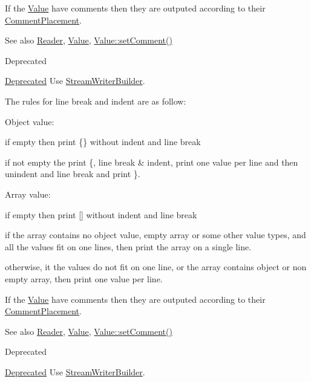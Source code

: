 If the \hyperlink{class_json_1_1_value}{Value} have comments then they are outputed according to their \hyperlink{namespace_json_a4fc417c23905b2ae9e2c47d197a45351}{Comment\+Placement}.

\begin{DoxySeeAlso}{See also}
\hyperlink{class_json_1_1_reader}{Reader}, \hyperlink{class_json_1_1_value}{Value}, \hyperlink{class_json_1_1_value_a29f3a30f7e5d3af6f38d57999bf5b480}{Value\+::set\+Comment()} 
\end{DoxySeeAlso}
\begin{DoxyRefDesc}{Deprecated}
\item[\hyperlink{deprecated__deprecated000009}{Deprecated}]Use \hyperlink{class_json_1_1_stream_writer_builder}{Stream\+Writer\+Builder}. \end{DoxyRefDesc}


The rules for line break and indent are as follow\+:
\begin{DoxyItemize}
\item Object value\+:
\begin{DoxyItemize}
\item if empty then print \{\} without indent and line break
\item if not empty the print \textquotesingle{}\{\textquotesingle{}, line break \& indent, print one value per line and then unindent and line break and print \textquotesingle{}\}\textquotesingle{}.
\end{DoxyItemize}
\item Array value\+:
\begin{DoxyItemize}
\item if empty then print \mbox{[}\mbox{]} without indent and line break
\item if the array contains no object value, empty array or some other value types, and all the values fit on one lines, then print the array on a single line.
\item otherwise, it the values do not fit on one line, or the array contains object or non empty array, then print one value per line.
\end{DoxyItemize}
\end{DoxyItemize}

If the \hyperlink{class_json_1_1_value}{Value} have comments then they are outputed according to their \hyperlink{namespace_json_a4fc417c23905b2ae9e2c47d197a45351}{Comment\+Placement}.

\begin{DoxySeeAlso}{See also}
\hyperlink{class_json_1_1_reader}{Reader}, \hyperlink{class_json_1_1_value}{Value}, \hyperlink{class_json_1_1_value_a29f3a30f7e5d3af6f38d57999bf5b480}{Value\+::set\+Comment()} 
\end{DoxySeeAlso}
\begin{DoxyRefDesc}{Deprecated}
\item[\hyperlink{deprecated__deprecated000019}{Deprecated}]Use \hyperlink{class_json_1_1_stream_writer_builder}{Stream\+Writer\+Builder}. \end{DoxyRefDesc}



